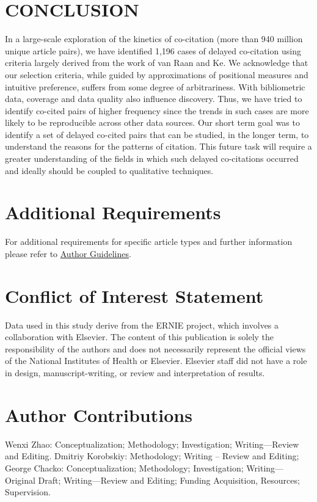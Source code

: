 \documentclass[utf8]{frontiersSCNS}
\begin{document}
\section{CONCLUSION} In a large-scale exploration of the kinetics of co-citation (more than 940 million unique article pairs), we have identified 1,196 cases of delayed co-citation using criteria largely derived from the work of van Raan and Ke. We acknowledge that our selection criteria, while guided by approximations of positional measures and intuitive preference, suffers from some degree of arbitrariness.  With bibliometric data, coverage and data quality also influence discovery. Thus, we have tried to identify co-cited pairs of higher frequency since the trends in such cases are more likely to be reproducible across other data sources. Our short term goal was to identify a set of delayed co-cited pairs that can be studied, in the longer term, to understand the reasons for the patterns of citation. This future task will require a greater understanding of the fields in which such delayed co-citations occurred and ideally should be coupled to qualitative techniques.
\section{Additional Requirements}

For additional requirements for specific article types and further information please refer to \href{http://www.frontiersin.org/about/AuthorGuidelines#AdditionalRequirements}{Author Guidelines}.

\section*{Conflict of Interest Statement}
Data used in this study derive from the ERNIE project, which involves a collaboration with Elsevier. The content of this publication is solely the responsibility of the authors and does not necessarily represent the official views of the National Institutes of Health or Elsevier.  Elsevier staff did not have a role in design, manuscript-writing, or review and interpretation of results.

\section*{Author Contributions}

Wenxi Zhao: Conceptualization; Methodology; Investigation; Writing—Review and Editing. Dmitriy Korobskiy: Methodology; Writing – Review and Editing; George Chacko: Conceptualization; Methodology; Investigation; Writing—Original Draft; Writing—Review and Editing; Funding Acquisition, Resources; Supervision.
\end{document}
